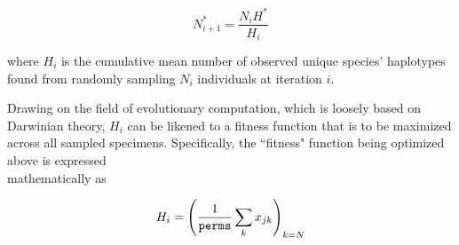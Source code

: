 \begin{equation}
N^*_{i+1} = \frac{N_iH^*}{H_i}
\end{equation}

\noindent where $H_i$ is the cumulative mean number of observed unique species' haplotypes found from randomly sampling $N_i$ individuals at iteration $i$.

 

Drawing on the field of evolutionary computation, which is loosely based on Darwinian theory, $H_i$ can be likened to a fitness function that is to be maximized across all sampled specimens. Specifically, the ``fitness" function being optimized above is expressed \\ mathematically as

\begin{equation}
H_i = \left(\dfrac{1}{{\tt perms}}\sum_{k}{x_{jk}}\right)_{k=N}
\end{equation}

